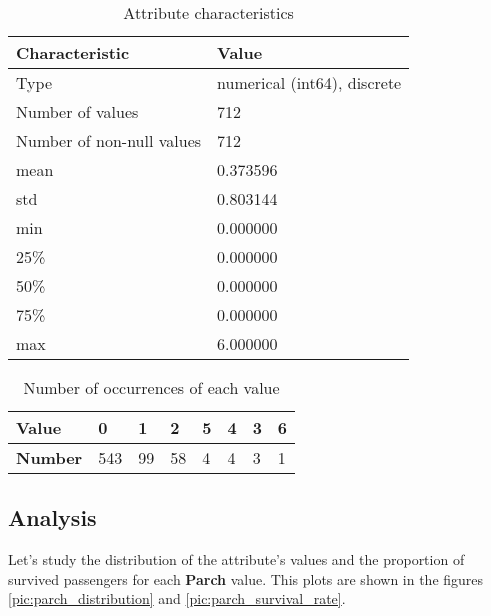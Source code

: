 \begin{table}[!ht]
    \centering
    \caption{Attribute characteristics}
    \begin{tabular}{|l|l|}
        \hline
        \textbf{Characteristic}   & \textbf{Value}              \\ \hline
        Type                      & numerical (int64), discrete \\ \hline
        Number of values          & 712                         \\ \hline
        Number of non-null values & 712                         \\ \hline
        mean                      & 0.373596                    \\ \hline
        std                       & 0.803144                    \\ \hline
        min                       & 0.000000                    \\ \hline
        25\%                      & 0.000000                    \\ \hline
        50\%                      & 0.000000                    \\ \hline
        75\%                      & 0.000000                    \\ \hline
        max                       & 6.000000                    \\ \hline
    \end{tabular}
    \label{table:parch_characteristics}
\end{table}

\begin{table}[!ht]
    \centering
    \caption{Number of occurrences of each value}
    \begin{tabular}{|l|l|l|l|l|l|l|l|}
        \hline
        \textbf{Value}  & 0   & 1  & 2  & 5 & 4 & 3 & 6 \\ \hline
        \textbf{Number} & 543 & 99 & 58 & 4 & 4 & 3 & 1 \\ \hline
    \end{tabular}
    \label{table:parch_value_counts}
\end{table}

\subsection{Analysis}
Let's study the distribution of the attribute's values and the proportion 
of survived passengers for each \textbf{Parch} value. This plots are shown
in the figures \ref{pic:parch_distribution} and \ref{pic:parch_survival_rate}.

